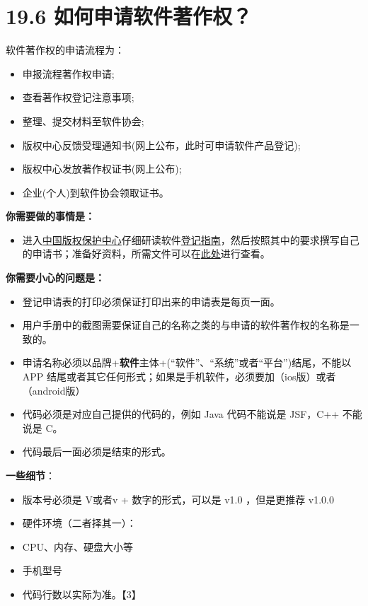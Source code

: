 \section{19.6
如何申请软件著作权？}\label{ux5982ux4f55ux7533ux8bf7ux8f6fux4ef6ux8457ux4f5cux6743}

软件著作权的申请流程为：

\begin{itemize}
\item
  申报流程著作权申请;
\item
  查看著作权登记注意事项;
\item
  整理、提交材料至软件协会;
\item
  版权中心反馈受理通知书(网上公布，此时可申请软件产品登记);
\item
  版权中心发放著作权证书(网上公布);
\item
  企业(个人)到软件协会领取证书。
\end{itemize}

\textbf{你需要做的事情是：}

\begin{itemize}
\item
  进入\href{http://www.ccopyright.com.cn/}{中国版权保护中心}仔细研读软件\href{http://www.ccopyright.com.cn/index.php?optionid=1033}{登记指南}，然后按照其中的要求撰写自己的申请书；准备好资料，所需文件可以在\href{http://www.ccopyright.com.cn/index.php?optionid=1080}{此处}进行查看。
\end{itemize}

\textbf{你需要小心的问题是：}

\begin{itemize}
\item
  登记申请表的打印必须保证打印出来的申请表是每页一面。
\item
  用户手册中的截图需要保证自己的名称之类的与申请的软件著作权的名称是一致的。
\item
  申请名称必须以品牌+\textbf{软件}主体+(``软件''、``系统''或者``平台'')结尾，不能以
  APP
  结尾或者其它任何形式；如果是手机软件，必须要加（ios版）或者（android版）
\item
  代码必须是对应自己提供的代码的，例如 Java 代码不能说是 JSF，C++
  不能说是 C。
\item
  代码最后一面必须是结束的形式。
\end{itemize}

\textbf{一些细节}：

\begin{itemize}
\item
  版本号必须是 V或者v + 数字的形式，可以是 v1.0 ，但是更推荐 v1.0.0
\item
  硬件环境（二者择其一）：
\item
  CPU、内存、硬盘大小等
\item
  手机型号
\item
  代码行数以实际为准。【3】
\end{itemize}

